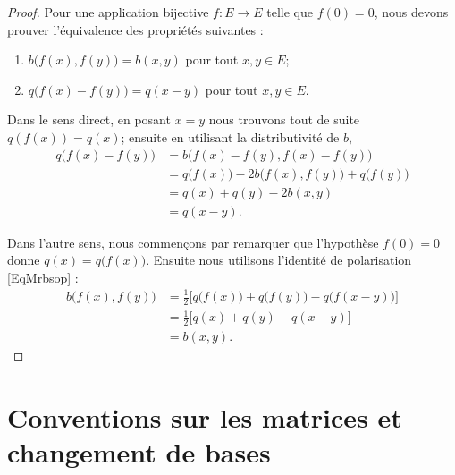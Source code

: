 \begin{proof}
    Pour une application bijective \( f\colon E\to E\) telle que \( f(0)=0\), nous devons prouver l'équivalence des propriétés suivantes :
    \begin{enumerate}
        \item
            \( b\big( f(x),f(y) \big)=b(x,y)\) pour tout \( x,y\in E\);
        \item
            \( q\big( f(x)-f(y) \big)=q(x-y)\) pour tout \( x,y\in E\).
    \end{enumerate}

    Dans le sens direct, en posant \( x=y\) nous trouvons tout de suite \( q(f(x))=q(x)\); ensuite en utilisant la distributivité de \( b\),
    \begin{subequations}
        \begin{align}
            q\big( f(x)-f(y) \big)&=b\big( f(x)-f(y),f(x)-f(y) \big)\\
            &=q\big( f(x) \big)-2b\big( f(x),f(y) \big)+q\big( f(y) \big)\\
            &=q(x)+q(y)-2b(x,y)\\
            &=q(x-y).
        \end{align}
    \end{subequations}

    Dans l'autre sens, nous commençons par remarquer que l'hypothèse \( f(0)=0\) donne \( q(x)=q\big( f(x) \big)\). Ensuite nous utilisons l'identité de polarisation \eqref{EqMrbsop} :
    \begin{subequations}
        \begin{align}
            b\big( f(x),f(y) \big)&=\frac{ 1 }{2}\big[ q\big( f(x) \big)+q\big( f(y) \big)-q\big( f(x-y) \big) \big]\\
            &=\frac{ 1 }{2}\big[ q(x)+q(y)-q(x-y) \big]\\
            &=b(x,y).
        \end{align}
    \end{subequations}
\end{proof}


\section{Conventions sur les matrices et changement de bases}
\label{SECooBTTTooZZABWA}

